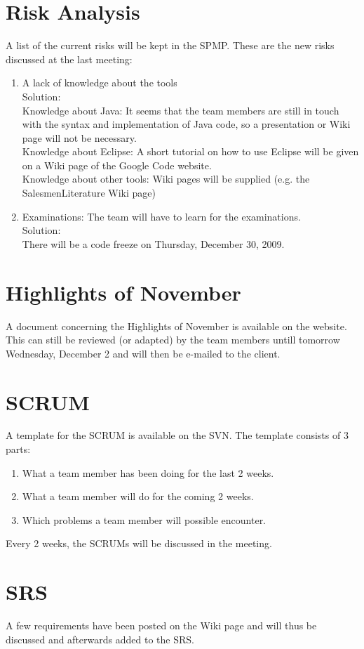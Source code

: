 \documentclass[a4paper, 12pt]{article}
\begin{document}
	\section{Risk Analysis}
A list of the current risks will be kept in the SPMP. These are the new risks discussed at the last meeting:\\
		\begin{enumerate}
		\item  A lack of knowledge about the tools\\
		Solution:\\
Knowledge about Java: It seems that the team members are still in touch with the syntax and implementation of Java code, so a presentation or Wiki page will not be necessary. \\
Knowledge about Eclipse: A short tutorial on how to use Eclipse will be given on a Wiki page of the Google Code website. \\
Knowledge about other tools: Wiki pages will be supplied (e.g. the SalesmenLiterature Wiki page)
		\item Examinations: The team will have to learn for the examinations.\\
		Solution:\\
There will be a code freeze on Thursday, December 30, 2009.
		\end{enumerate}
	\section{Highlights of November}
A document concerning the Highlights of November is available on the website. This can still be reviewed (or adapted) by the team members untill tomorrow Wednesday, December 2 and will then be e-mailed to the client.
	\section{SCRUM}
A template for the SCRUM is available on the SVN. The template consists of 3 parts:
		\begin{enumerate}
			\item What a team member has been doing for the last 2 weeks.
			\item What a team member will do for the coming 2 weeks.
			\item Which problems a team member will possible encounter.
		\end{enumerate}
Every 2 weeks, the SCRUMs will be discussed in the meeting.

	\section{SRS}
A few requirements have been posted on the Wiki page and will thus be discussed and afterwards added to the SRS.
\end{document}
